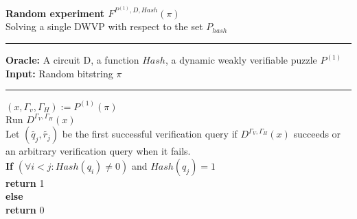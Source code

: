%
%
\begin{codeblock}
  \textbf{Random experiment $F^{P^{(1)}, D, Hash}(\pi)$} \\
  Solving a single DWVP with respect to the set $P_{hash}$
  \medskip

  \hrule

  \medskip

  \textbf{Oracle:} A circuit D, a function $Hash$, a dynamic weakly verifiable puzzle $P^{(1)}$\\
  \textbf{Input:} Random bitstring $\pi$
  \medskip\hrule\medskip

  $(x, \Gamma_v, \Gamma_H) := P^{(1)}(\pi)$ \\
  Run $D^{\Gamma_V, \Gamma_H}(x)$ \\
  \IndI Let $(\widetilde{q_j},\widetilde{r_j})$ be the first successful verification query if $D^{\Gamma_V, \Gamma_H}(x)$ succeeds or \\
  \IndI an arbitrary verification query when it fails.\\
  \textbf{If} $(\forall i < j :  Hash(q_i) \neq 0 )$ and $Hash(q_j) = 1$ \\
  \IndI \textbf{return} 1\\
  \textbf{else}\\
  \IndI \textbf{return} 0\\

\end{codeblock}
%
%




